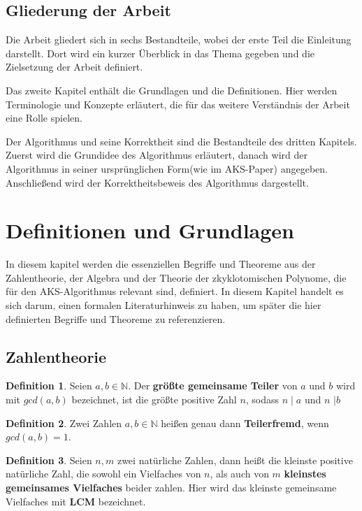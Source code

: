 \documentclass[12pt,oneside]{article}
\theoremstyle{remark}
\theoremstyle{definition}
\newtheorem{definition}{Definition}[section]
\begin{document}
\subsection{Gliederung der Arbeit}
Die Arbeit gliedert sich in sechs Bestandteile, wobei der
erste Teil die Einleitung darstellt. Dort wird ein kurzer Überblick in das Thema gegeben und die Zielsetzung der Arbeit definiert.

Das zweite Kapitel enthält die Grundlagen und die Definitionen. Hier werden Terminologie und Konzepte erläutert, die für das weitere Verständnis der Arbeit eine Rolle spielen. 

Der Algorithmus und seine Korrektheit sind die Bestandteile des dritten Kapitels. Zuerst wird die Grundidee des Algorithmus erläutert, danach wird der Algorithmus in seiner ursprünglichen Form(wie im AKS-Paper) angegeben. Anschließend wird der Korrektheitsbeweis des Algorithmus dargestellt. 
  

\section{Definitionen und Grundlagen}
In diesem kapitel werden die essenziellen Begriffe und Theoreme aus der Zahlentheorie, der Algebra und der Theorie der zkyklotomischen Polynome, die für den AKS-Algorithmus relevant sind, definiert. In diesem Kapitel handelt es sich darum, einen formalen Literaturhinweis zu haben, um später die hier definierten Begriffe und Theoreme zu referenzieren.
\subsection{Zahlentheorie}
\theoremstyle{definition}
\begin{definition}\label{Df_1}
Seien $a,b \in \mathbb{N}$. Der \textbf{größte gemeinsame Teiler} von $a$ und $b$ wird mit $gcd(a,b)$ bezeichnet, ist die größte positive Zahl $n$, sodass $n \mid a$ und $n$ $ \mid b$
\end{definition}

\smallskip 

\begin{definition}\label{Df_2}
Zwei Zahlen $a,b \in \mathbb{N}$ heißen genau dann \textbf{Teilerfremd}, wenn $gcd(a,b) = 1$.
\end{definition}

\smallskip

\begin{definition}
Seien $n,m$ zwei natürliche Zahlen, dann heißt die kleinste positive natürliche Zahl, die sowohl ein Vielfaches von $n$, als auch von $m$ \textbf{kleinstes gemeinsames Vielfaches} beider zahlen. Hier wird das kleinste gemeinsame Vielfaches mit \textbf{LCM} bezeichnet.
\end{definition}
\end{document}
